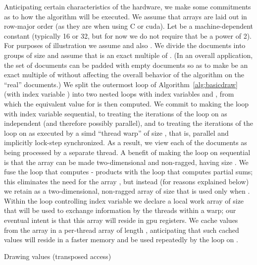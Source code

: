 \documentclass[10pt,nohyperref]{sigplanconf}
\newcommand*\Assign[2]{\State #1  #2}
\newcommand*\LocalArray[1]{\State {\bf local array} #1}
\newcommand*\Bind[2]{\State {\bf let} #1  #2}
\newcommand*\ProcTwoX[1]{\State\hbox{\hskip-\algorithmicindent\hskip\wd\proctwobox#1}}
\newcommand*\UseCodeChunk[1]{\State {#1}}
\begin{document}
Anticipating certain characteristics of the hardware,
we make some commitments as to how the algorithm will be executed.  We assume that
arrays are laid out in row-major order (as they are when using C or {\sc cuda}).
Let  be a
machine-dependent constant (typically 16 or 32, but for now we do not require that  be a power of 2).
For purposes of illustration we assume  and also .
We divide the documents into groups of size  and assume that  is an exact multiple of .
(In an overall application, the set of documents can be padded with empty documents
so as to make  be an exact multiple of  without affecting the overall behavior of the algorithm on the ``real'' documents.)
We split the outermost loop of Algorithm~\ref{alg:basicdraw} (with index variable ) into two nested loops with
index variables  and , from which the equivalent value for  is then computed.
We commit to making the loop with index variable  sequential,
to treating the iterations of the loop on  as independent (and therefore possibly parallel),
and to treating the iterations of the loop on  as executed by a {\sc simd} ``thread warp'' of size , that is,
parallel and implicitly lock-step synchronized.
As a result, we view each of the  documents as being processed by a separate thread.
A benefit of making the loop on  sequential is that the array  can be made two-dimensional and non-ragged,
having size .  We fuse the loop that computes - products
with the loop that computes partial sums; this eliminates the need for the array ,
but instead (for reasons explained below) we retain  as a two-dimensional, non-ragged array of size 
that is used only when .  Within the loop controlling index variable  we declare a local work array 
of size  that will be used to exchange information by the  threads within a warp; our eventual intent
is that this array will reside in {\sc gpu} registers.
We cache values from the array  in a per-thread array  of length ,
anticipating that such cached values will reside in a faster memory and
be used repeatedly by the loop on .


\begin{algorithm}[t]
\caption{Drawing  values (transposed access)}\label{alg:transposedraw}
\end{algorithm}
\end{document}
